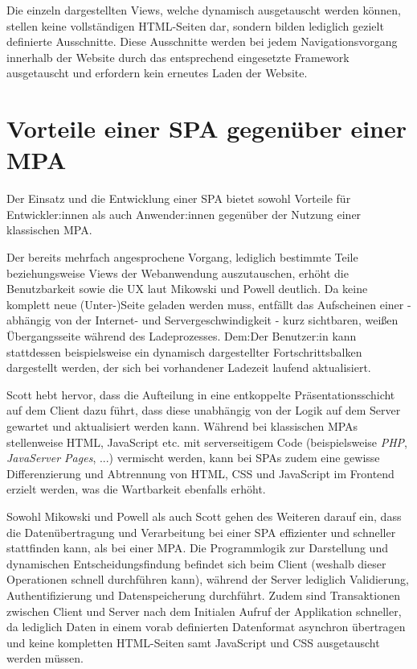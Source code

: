 \documentclass[a4paper,12pt,twoside]{scrreprt}
\begin{document}
\medskip

Die einzeln dargestellten Views, welche dynamisch ausgetauscht werden können, stellen keine vollständigen HTML-Seiten dar, sondern bilden lediglich gezielt definierte Ausschnitte. Diese Ausschnitte werden bei jedem Navigationsvorgang innerhalb der Website durch das entsprechend eingesetzte Framework ausgetauscht und erfordern kein erneutes Laden der Website. \parencite[][Seite 10f.]{scott_spa_2015}

\section{Vorteile einer \acs{SPA} gegenüber einer \acs{MPA}}
\label{sec:vorteile-spa-mpa}
Der Einsatz und die Entwicklung einer \ac{SPA} bietet sowohl Vorteile für Entwickler:innen als auch Anwender:innen gegenüber der Nutzung einer klassischen \ac{MPA}.

Der bereits mehrfach angesprochene Vorgang, lediglich bestimmte Teile beziehungsweise Views der Webanwendung auszutauschen, erhöht die Benutzbarkeit sowie die \ac{UX} laut Mikowski und Powell deutlich. Da keine komplett neue (Unter-)Seite geladen werden muss, entfällt das Aufscheinen einer - abhängig von der Internet- und Servergeschwindigkeit - kurz sichtbaren, weißen Übergangsseite während des Ladeprozesses. Dem:Der Benutzer:in kann stattdessen beispielsweise ein dynamisch dargestellter Fortschrittsbalken dargestellt werden, der sich bei vorhandener Ladezeit laufend aktualisiert. \parencite[][Seite 20]{mikowski_single_2013}

Scott hebt hervor, dass die Aufteilung in eine entkoppelte Präsentationsschicht auf dem Client dazu führt, dass diese unabhängig von der Logik auf dem Server gewartet und aktualisiert werden kann. Während bei klassischen \acsp{MPA} stellenweise HTML, JavaScript etc. mit serverseitigem Code (beispielsweise \textit{PHP}, \textit{JavaServer Pages}, ...) vermischt werden, kann bei \acsp{SPA} zudem eine gewisse Differenzierung und Abtrennung von HTML, \ac{CSS} und JavaScript im Frontend erzielt werden, was die Wartbarkeit ebenfalls erhöht. \parencite[][Seite 13]{scott_spa_2015}

\newpage

Sowohl Mikowski und Powell als auch Scott gehen des Weiteren darauf ein, dass die Datenübertragung und Verarbeitung bei einer \ac{SPA} effizienter und schneller stattfinden kann, als bei einer \ac{MPA}. Die Programmlogik zur Darstellung und dynamischen Entscheidungsfindung befindet sich beim Client (weshalb dieser Operationen schnell durchführen kann), während der Server lediglich Validierung, Authentifizierung und Datenspeicherung durchführt. \parencite[][Seite 20]{mikowski_single_2013} Zudem sind Transaktionen zwischen Client und Server nach dem Initialen Aufruf der Applikation schneller, da lediglich Daten in einem vorab definierten Datenformat asynchron übertragen und keine kompletten HTML-Seiten samt JavaScript und \ac{CSS} ausgetauscht werden müssen. \parencite[][Seite 13]{scott_spa_2015}
\end{document}
